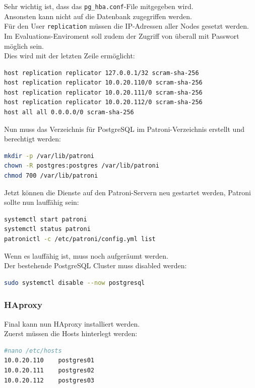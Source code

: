 Sehr wichtig ist, dass das \texttt{pg\_hba.conf}-File mitgegeben wird.\\
Ansonsten kann nicht auf die Datenbank zugegriffen werden.\\
Für den User \texttt{replication} müssen die IP-Adressen aller Nodes gesetzt werden.\\
Im Evaluations-Enviroment soll zudem der Zugriff von überall mit Passwort möglich sein.\\
Dies wird mit der letzten Zeile ermöglicht:
\lstset{style=gra_codestyle}
\begin{lstlisting}[language=bash, caption=Patroni Bootstrap - pg\_hba,captionpos=b,label={lst:patroni-pg_hba},breaklines=true]
host replication replicator 127.0.0.1/32 scram-sha-256
host replication replicator 10.0.20.110/0 scram-sha-256
host replication replicator 10.0.20.111/0 scram-sha-256
host replication replicator 10.0.20.112/0 scram-sha-256
host all all 0.0.0.0/0 scram-sha-256
\end{lstlisting}

Nun muss das Verzeichnis für PostgreSQL im Patroni-Verzeichnis erstellt und berechtigt werden:
\lstset{style=gra_codestyle}
\begin{lstlisting}[language=bash, caption=Patroni Bootstrap - Patroni-Verzeichnis,captionpos=b,label={lst:patroni-directory},breaklines=true]
mkdir -p /var/lib/patroni
chown -R postgres:postgres /var/lib/patroni
chmod 700 /var/lib/patroni
\end{lstlisting}

Jetzt können die Dienste auf den Patroni-Servern neu gestartet werden, Patroni sollte nun lauffähig sein:
\lstset{style=gra_codestyle}
\begin{lstlisting}[language=bash, caption=Patroni Bootstrap - Neu starten,captionpos=b,label={lst:patroni-restart},breaklines=true]
systemctl start patroni
systemctl status patroni
patronictl -c /etc/patroni/config.yml list
\end{lstlisting}

Wenn es lauffähig ist, muss noch aufgeräumt werden.\\
Der bestehende \Gls{PostgreSQL Cluster} muss disabled werden:
\lstset{style=gra_codestyle}
\begin{lstlisting}[language=bash, caption=Patroni Bootstrap - Disable PostgreSQL,captionpos=b,label={lst:patroni-disable-postgresql},breaklines=true]
sudo systemctl disable --now postgresql
\end{lstlisting}

\subsubsection{HAproxy}
Final kann nun HAproxy installiert werden.\\
Zuerst müssen die Hosts hinterlegt werden:
\lstset{style=gra_codestyle}
\begin{lstlisting}[language=bash, caption=HAproxy - Hostliste,captionpos=b,label={lst:haproxy_hostlist},breaklines=true]
#nano /etc/hosts
10.0.20.110    postgres01
10.0.20.111    postgres02
10.0.20.112    postgres03
\end{lstlisting}


